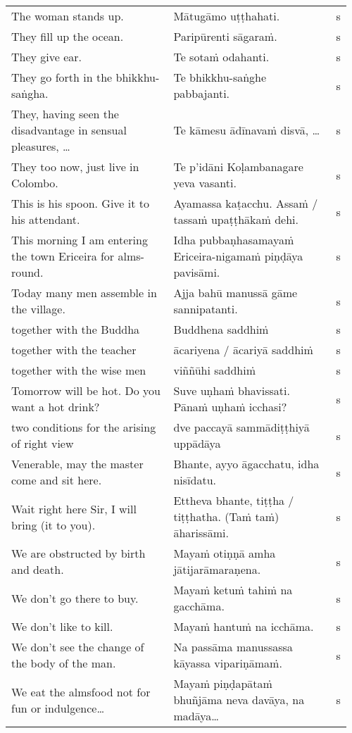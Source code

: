 \documentclass[a5paper]{memoir}
\begin{document}
\begin{longtable}{L{0.48\linewidth} L{0.48\linewidth} H}
The woman stands up. & Mātugāmo uṭṭhahati. & s\\[0pt]
They fill up the ocean. & Paripūrenti sāgaraṁ. & s\\[0pt]
They give ear. & Te sotaṁ odahanti. & s\\[0pt]
They go forth in the bhikkhu-saṅgha. & Te bhikkhu-saṅghe pabbajanti. & s\\[0pt]
They, having seen the disadvantage in sensual pleasures, \ldots{} & Te kāmesu ādīnavaṁ disvā, \ldots{} & s\\[0pt]
They too now, just live in Colombo. & Te p'idāni Koḷambanagare yeva vasanti. & s\\[0pt]
This is his spoon. Give it to his attendant. & Ayamassa kaṭacchu. Assaṁ / tassaṁ upaṭṭhākaṁ dehi. & s\\[0pt]
This morning I am entering the town Ericeira for alms-round. & Idha pubbaṇhasamayaṁ Ericeira-nigamaṁ piṇḍāya pavisāmi. & s\\[0pt]
Today many men assemble in the village. & Ajja bahū manussā gāme sannipatanti. & s\\[0pt]
together with the Buddha & Buddhena saddhiṁ & s\\[0pt]
together with the teacher & ācariyena / ācariyā saddhiṁ & s\\[0pt]
together with the wise men & viññūhi saddhiṁ & s\\[0pt]
Tomorrow will be hot. Do you want a hot drink? & Suve uṇhaṁ bhavissati. Pānaṁ uṇhaṁ icchasi? & s\\[0pt]
two conditions for the arising of right view & dve paccayā sammādiṭṭhiyā uppādāya & s\\[0pt]
Venerable, may the master come and sit here. & Bhante, ayyo āgacchatu, idha nisīdatu. & s\\[0pt]
Wait right here Sir, I will bring (it to you). & Ettheva bhante, tiṭṭha / tiṭṭhatha. (Taṁ taṁ) āharissāmi. & s\\[0pt]
We are obstructed by birth and death. & Mayaṁ otiṇṇā amha jātijarāmaraṇena. & s\\[0pt]
We don't go there to buy. & Mayaṁ ketuṁ tahiṁ na gacchāma. & s\\[0pt]
We don't like to kill. & Mayaṁ hantuṁ na icchāma. & s\\[0pt]
We don't see the change of the body of the man. & Na passāma manussassa kāyassa vipariṇāmaṁ. & s\\[0pt]
We eat the almsfood not for fun or indulgence\ldots{} & Mayaṁ piṇḍapātaṁ bhuñjāma neva davāya, na madāya\ldots{} & s\\[0pt]

\end{longtable}
\end{document}
